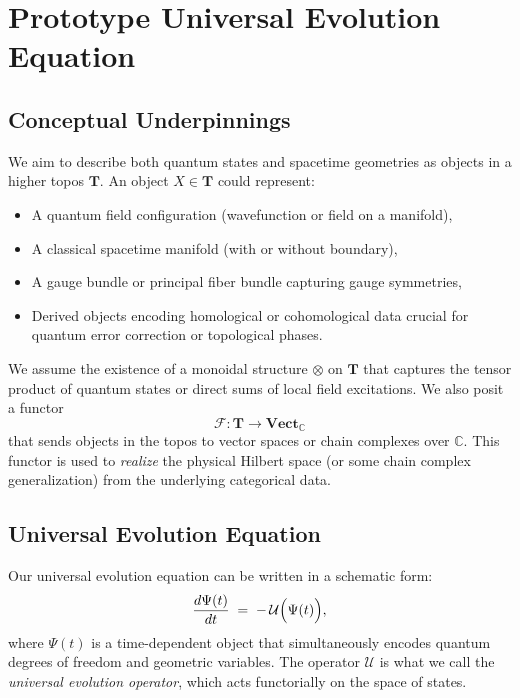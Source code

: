 \documentclass[11pt]{article}
\begin{document}
\section{Prototype Universal Evolution Equation}
\label{sec:prototype-equations}

\subsection{Conceptual Underpinnings}

We aim to describe both quantum states and spacetime geometries as objects in a higher topos $\mathbf{T}$. An object $X \in \mathbf{T}$ could represent:
\begin{itemize}
    \item A quantum field configuration (wavefunction or field on a manifold),
    \item A classical spacetime manifold (with or without boundary),
    \item A gauge bundle or principal fiber bundle capturing gauge symmetries,
    \item Derived objects encoding homological or cohomological data crucial for quantum error correction or topological phases.
\end{itemize}

We assume the existence of a monoidal structure $\otimes$ on $\mathbf{T}$ that captures the tensor product of quantum states or direct sums of local field excitations. We also posit a functor
\[
\mathcal{F}: \mathbf{T} \to \mathbf{Vect}_{\mathbb{C}}
\]
that sends objects in the topos to vector spaces or chain complexes over $\mathbb{C}$. This functor is used to \emph{realize} the physical Hilbert space (or some chain complex generalization) from the underlying categorical data. 

\subsection{Universal Evolution Equation}

Our universal evolution equation can be written in a schematic form:
\begin{equation}
\label{eq:universal-evolution}
\frac{d\Psi(t)}{dt} \;=\; -\, \mathcal{U}\Bigl(\Psi(t)\Bigr),
\end{equation}
where $\Psi(t)$ is a time-dependent object that simultaneously encodes quantum degrees of freedom and geometric variables. The operator $\mathcal{U}$ is what we call the \emph{universal evolution operator}, which acts functorially on the space of states. 
\end{document}
